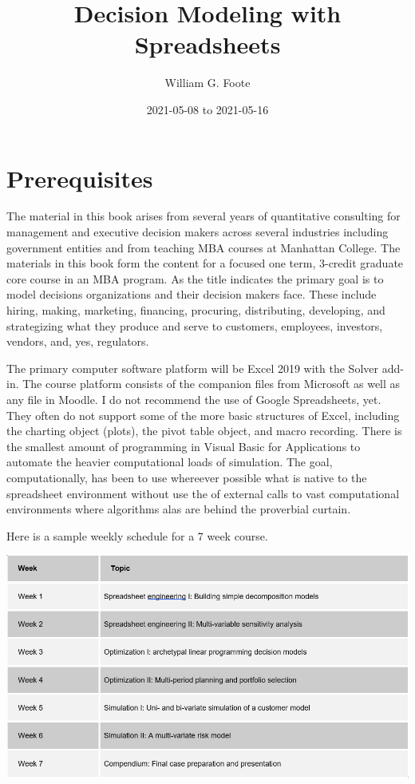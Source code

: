 \documentclass[
]{book}
\title{Decision Modeling with Spreadsheets}
\author{William G. Foote}
\date{2021-05-08 to 2021-05-16}
\begin{document}
\maketitle

{
\setcounter{tocdepth}{1}
\tableofcontents
}
\hypertarget{prerequisites}{%
\chapter*{Prerequisites}\label{prerequisites}}

The material in this book arises from several years of quantitative consulting for management and executive decision makers across several industries including government entities and from teaching MBA courses at Manhattan College. The materials in this book form the content for a focused one term, 3-credit graduate core course in an MBA program. As the title indicates the primary goal is to model decisions organizations and their decision makers face. These include hiring, making, marketing, financing, procuring, distributing, developing, and strategizing what they produce and serve to customers, employees, investors, vendors, and, yes, regulators.

The primary computer software platform will be Excel 2019 with the Solver add-in. The course platform consists of the companion files from Microsoft as well as any file in Moodle. I do not recommend the use of Google Spreadsheets, yet. They often do not support some of the more basic structures of Excel, including the charting object (plots), the pivot table object, and macro recording. There is the smallest amount of programming in Visual Basic for Applications to automate the heavier computational loads of simulation. The goal, computationally, has been to use whereever possible what is native to the spreadsheet environment without use the of external calls to vast computational environments where algorithms alas are behind the proverbial curtain.

Here is a sample weekly schedule for a 7 week course.

\includegraphics{images/01/weekly-schedule.jpg}
\end{document}
